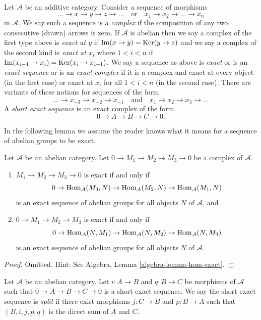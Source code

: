 \begin{definition}
\label{definition-exact}
Let $\mathcal{A}$ be an additive category. Consider a sequence of morphisms
$$
\ldots \to x \to y \to z \to \ldots
\quad\text{or}\quad
x_1 \to x_2 \to \ldots \to x_n
$$
in $\mathcal{A}$. We say such a sequence is a {\it complex} if the
composition of any two consecutive (drawn) arrows is zero.
If $\mathcal{A}$ is abelian then we say a complex of the first
type above is {\it exact at $y$} if $\mathop{\mathrm{Im}}(x \to y) = \mathop{\mathrm{Ker}}(y \to z)$
and we say a complex of the second kind is {\it exact at $x_i$}
where $1 < i < n$ if
$\mathop{\mathrm{Im}}(x_{i - 1} \to x_i) = \mathop{\mathrm{Ker}}(x_i \to x_{i + 1})$. We say a
sequence as above is {\it exact} or is an {\it exact sequence} or is an
{\it exact complex} if it is a complex and exact at every object (in
the first case) or exact at $x_i$ for all $1 < i < n$ (in the second case).
There are variants of these notions for sequences of the form
$$
\ldots \to x_{-3} \to x_{-2} \to x_{-1}
\quad\text{and}\quad
x_1 \to x_2 \to x_3 \to \ldots
$$
A {\it short exact sequence} is an exact complex of the form
$$
0 \to A  \to B \to C \to 0.
$$
\end{definition}

\noindent
In the following lemma we assume the reader knows what it means
for a sequence of abelian groups to be exact.

\begin{lemma}
\label{lemma-check-exactness}
Let $\mathcal{A}$ be an abelian category.
Let $0 \to M_1 \to M_2 \to M_3 \to 0$ be a complex of $\mathcal{A}$.
\begin{enumerate}
\item $M_1 \to M_2 \to M_3 \to 0$ is exact if and only if
$$
0 \to \mathop{\mathrm{Hom}}\nolimits_\mathcal{A}(M_3, N) \to
\mathop{\mathrm{Hom}}\nolimits_\mathcal{A}(M_2, N) \to \mathop{\mathrm{Hom}}\nolimits_\mathcal{A}(M_1, N)
$$
is an exact sequence of abelian groups for all objects $N$ of
$\mathcal{A}$, and
\item $0 \to M_1 \to M_2 \to M_3$ is exact if and only if
$$
0 \to \mathop{\mathrm{Hom}}\nolimits_\mathcal{A}(N, M_1) \to \mathop{\mathrm{Hom}}\nolimits_\mathcal{A}(N, M_2) \to
\mathop{\mathrm{Hom}}\nolimits_\mathcal{A}(N, M_3)
$$
is an exact sequence of abelian groups for all objects $N$ of $\mathcal{A}$.
\end{enumerate}
\end{lemma}

\begin{proof}
Omitted. Hint: See
Algebra, Lemma \ref{algebra-lemma-hom-exact}.
\end{proof}

\begin{definition}
\label{definition-ses-split}
Let $\mathcal{A}$ be an abelian category.
Let $i : A \to B$ and $q : B \to C$ be morphisms
of $\mathcal{A}$ such that
$0 \to A \to B \to C \to 0$ is a short
exact sequence. We say the short exact
sequence is {\it split} if there exist
morphisms $j : C \to B$ and $p : B \to A$ such
that $(B, i, j, p, q)$ is the direct sum of $A$ and $C$.
\end{definition}

